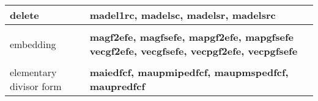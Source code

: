 \begin{center}
\begin{tabular}{|p{1.1in}|p{4.0in}|}
delete & 
{\bf madel1rc, madelsc, madelsr, madelsrc} \\[1.5ex]
\hline &\\[-1.3ex]

embedding & 
{\bf magf2efe, magfsefe, mapgf2efe, mapgfsefe} \newline
{\bf vecgf2efe, vecgfsefe, vecpgf2efe, vecpgfsefe} \\[1.5ex]
\hline &\\[-1.3ex]

elementary \newline
divisor form & 
{\bf maiedfcf, maupmipedfcf, maupmspedfcf, maupredfcf} \\[4.8ex]
\hline
\end{tabular}
\end{center}

\newpage

